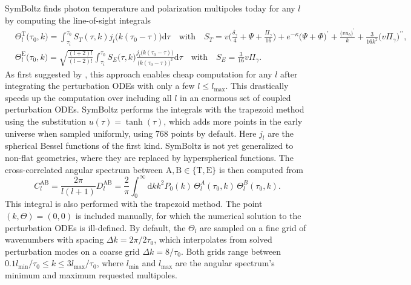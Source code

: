 \documentclass{aa}
\newcommand\lmax{l_\text{max}}
\begin{document}
SymBoltz finds photon temperature and polarization multipoles today for any $l$ by computing the line-of-sight integrals
\label{sec:cmb}
\begin{align*}
    &
    \Theta_l^\mathrm{T}\big(\tau_0,k\big) = \int_{\tau_i}^{\tau_0} S_T(\tau,k) j_l\big(k(\tau_0-\tau)\big) \mathrm{d}\tau \quad \text{with} \quad
    S_T = v \bigg( \frac{\delta_\gamma}{4} + \Psi + \frac{\Pi_\gamma}{16} \bigg) + e^{-\kappa} \big( \Psi + \Phi \big)^\prime + \frac{\big(v u_b\big)^\prime}{k} + \frac{3}{16k^2}\big(v \Pi_\gamma\big)^{\prime\prime}, \\
    &
    \Theta_l^\mathrm{E}\big(\tau_0,k\big) = \sqrt{\frac{(l+2)!}{(l-2)!}} \int_{\tau_i}^{\tau_0} S_E\big(\tau,k\big) \frac{j_l\big(k(\tau_0-\tau)\big)}{\big(k(\tau_0-\tau)\big)^2} \mathrm{d}\tau \quad \text{with} \quad 
    S_E = \frac{3}{16} v \Pi_\gamma .
\end{align*}
As first suggested by \cite{seljakLineSightApproach1996}, this approach enables cheap computation for any $l$ after integrating the perturbation ODEs with only a few $l \leq \lmax$.
This drastically speeds up the computation over including all $l$ in an enormous set of coupled perturbation ODEs.
SymBoltz performs the integrals with the trapezoid method using the substitution $u(\tau) = \tanh(\tau)$, which adds more points in the early universe when sampled uniformly, using $768$ points by default.
Here $j_l$ are the spherical Bessel functions of the first kind.
SymBoltz is not yet generalized to non-flat geometries, where they are replaced by hyperspherical functions.
The cross-correlated angular spectrum between $\mathrm{A},\mathrm{B} \in \{\mathrm{T},\mathrm{E}\}$ is then computed from
\begin{equation*}
    C_l^\mathrm{AB} = \frac{2\pi}{l(l+1)} D_l^\mathrm{AB} = \frac{2}{\pi} \int_0^\infty \mathrm{d}k k^2 P_0(k) \, \Theta_l^A(\tau_0,k) \, \Theta_l^B(\tau_0,k) .
\end{equation*}
This integral is also performed with the trapezoid method.
The point $(k, \Theta) = (0, 0)$ is included manually, for which the numerical solution to the perturbation ODEs is ill-defined.
By default, the $\Theta_l$ are sampled on a fine grid of wavenumbers with spacing $\Delta k = 2\pi/2 \tau_0$, which interpolates from solved perturbation modes on a coarse grid $\Delta k = 8/\tau_0$.
Both grids range between $0.1 l_\text{min}/\tau_0 \leq k \leq 3 l_\text{max}/\tau_0$, where $l_\text{min}$ and $l_\text{max}$ are the angular spectrum's minimum and maximum requested multipoles.
\end{document}
